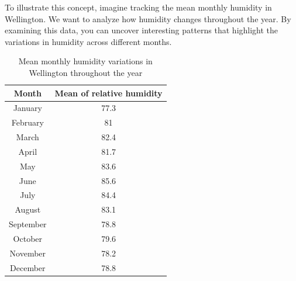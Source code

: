 To illustrate this concept, imagine tracking the mean monthly humidity in Wellington. We want to analyze how humidity changes throughout the year. By examining this data, you can uncover interesting patterns that highlight the variations in humidity across different months. 



\begin{table}[ht]
	\caption{Mean monthly humidity variations in Wellington throughout the year} %
	\centering %
	\begin{tabular}{c c } %
		\hline\hline %
		Month & Mean of relative humidity \\ [0.5ex] %
		\hline %
		January & 77.3 \\ %
		February & 81 \\
		March & 82.4 \\
		April & 81.7 \\
		May & 83.6 \\ 
		June & 85.6 \\
		July & 84.4 \\
		August & 83.1 \\ 
		September & 78.8 \\
		October & 79.6 \\
		November & 78.2 \\
		December & 78.8 \\ [1ex] %
		\hline %
	\end{tabular}
	\label{table:nonlin} %
\end{table}

